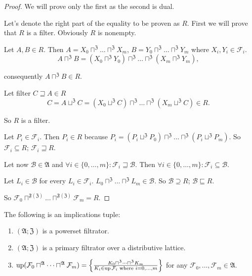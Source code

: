 \begin{proof}
We will prove only the first as the second is dual.

Let's denote the right part of the equality to be proven as $R$.
First we will prove that $R$ is a filter. Obviously $R$ is nonempty.

Let $A,B\in R$. Then $A=X_{0}\sqcap^{\mathfrak{Z}}\dots\sqcap^{\mathfrak{Z}}X_{m}$,
$B=Y_{0}\sqcap^{\mathfrak{Z}}\dots\sqcap^{\mathfrak{Z}}Y_{m}$ where
$X_{i},Y_{i}\in\mathcal{F}_{i}$.
\[
A\sqcap^{\mathfrak{Z}}B=(X_{0}\sqcap^{\mathfrak{Z}}Y_{0})\sqcap^{\mathfrak{Z}}\dots\sqcap^{\mathfrak{Z}}(X_{m}\sqcap^{\mathfrak{Z}}Y_{m}),
\]


consequently $A\sqcap^{\mathfrak{Z}}B\in R$.

Let filter $C\sqsupseteq A\in R$
\[
C=A\sqcup^{\mathfrak{Z}}C=(X_{0}\sqcup^{\mathfrak{Z}}C)\sqcap^{\mathfrak{Z}}\dots\sqcap^{\mathfrak{Z}}(X_{m}\sqcup^{\mathfrak{Z}}C)\in R.
\]


So $R$ is a filter.

Let $P_{i}\in\mathcal{F}_{i}$. Then $P_{i}\in R$ because $P_{i}=(P_{i}\sqcup^{\mathfrak{Z}}P_{0})\sqcap^{\mathfrak{Z}}\dots\sqcap^{\mathfrak{Z}}(P_{i}\sqcup^{\mathfrak{Z}}P_{m})$.
So $\mathcal{F}_{i}\subseteq R$; $\mathcal{F}_{i}\sqsupseteq R$.

Let now $\mathcal{B}\in\mathfrak{A}$ and $\forall i\in\{0,\dots,m\}:\mathcal{F}_{i}\sqsupseteq\mathcal{B}$.
Then $\forall i\in\{0,\dots,m\}:\mathcal{F}_{i}\subseteq\mathcal{B}$.

Let $L_{i}\in\mathcal{B}$ for every $L_{i}\in\mathcal{F}_{i}$. $L_{0}\sqcap^{\mathfrak{Z}}\dots\sqcap^{\mathfrak{Z}}L_{m}\in\mathcal{B}$.
So $\mathcal{B}\supseteq R$; $\mathcal{B}\sqsubseteq R$.

So $\mathcal{F}_{0}\sqcap^{\mathfrak{F}(\mathfrak{Z})}\dots\sqcap^{\mathfrak{F}(\mathfrak{Z})}\mathcal{F}_{m}=R$.\end{proof}
\begin{cor}
\label{f-fin-filt-meet}The following is an implications tuple:
\begin{enumerate}
\item \label{f-fin-filt-meet-p}$(\mathfrak{A};\mathfrak{Z})$ is a powerset
filtrator.
\item \label{fin-filt-meet-fltr}$(\mathfrak{A};\mathfrak{Z})$ is a primary
filtrator over a distributive lattice.
\item \label{fin-filt-meet-conc}$\operatorname{up}(\mathcal{F}_{0}\sqcap^{\mathfrak{A}}\dots\sqcap^{\mathfrak{A}}\mathcal{F}_{m})=\left\{ \frac{K_{0}\sqcap^{\mathfrak{Z}}\dots\sqcap^{\mathfrak{Z}}K_{m}}{K_{i}\in\operatorname{up}\mathcal{F}_{i}\text{ where }i=0,\dots,m}\right\}$
for any $\mathcal{F}_{0},\dots,\mathcal{F}_{m}\in\mathfrak{A}$.
\end{enumerate}
\end{cor}
